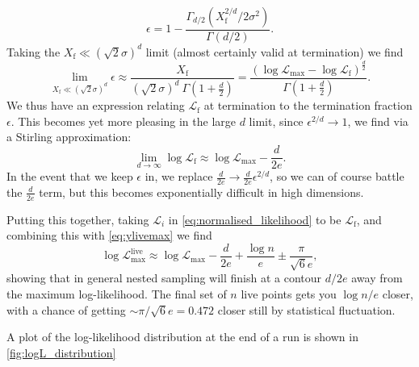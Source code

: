 \documentclass[usenatbib]{mnras}
\begin{document}
\begin{equation}
\epsilon = 1- \frac{\Gamma_{d/2}\left(X_\mathrm{f}^{2/d}/2\sigma^2\right)}{\Gamma(d/2)}.
\end{equation}
Taking the $X_\mathrm{f}\ll (\sqrt{2}\sigma)^d$ limit (almost certainly valid at termination) we find
\begin{equation}
    \lim_{X_\mathrm{f}\ll (\sqrt{2}\sigma)^d} \epsilon \approx \frac{X_\mathrm{f}}{(\sqrt{2}\sigma)^d \ \Gamma\left(1+\frac{d}{2}\right)} = \frac{(\log\mathcal{L}_\mathrm{max}-\log\mathcal{L}_\mathrm{f})^{\frac{d}{2}}}{\Gamma\left(1+\frac{d}{2}\right)}.
\end{equation}
We thus have an expression relating $\mathcal{L}_\mathrm{f}$ at termination to the termination fraction $\epsilon$. This becomes yet more pleasing in the large $d$ limit, since $\epsilon^{2/d}\to 1$, we find via a Stirling approximation:
\begin{equation}
    \lim_{d\to\infty} \log\mathcal{L}_\mathrm{f} \approx \log\mathcal{L}_\mathrm{max} - \frac{d}{2e}.
\end{equation}
In the event that we keep $\epsilon$ in, we replace $\frac{d}{2e}\to \frac{d}{2e}\epsilon^{2/d}$, so we can of course battle the $\frac{d}{2e}$ term, but this becomes exponentially difficult in high dimensions.
\par
Putting this together, taking $\mathcal{L}_i$ in \eqref{eq:normalised_likelihood} to be $\mathcal{L}_\mathrm{f}$, and combining this with \eqref{eq:ylivemax} we find
\begin{equation}
    \boxed{
        \log{\mathcal{L}}_\mathrm{max}^\mathrm{live} \approx \log\mathcal{L}_\mathrm{max} - \frac{d}{2e} + \frac{\log n}{e} \pm \frac{\pi}{\sqrt{6}e}
    },
\end{equation}
showing that in general nested sampling will finish at a contour $d/2e$ away from the maximum log-likelihood. The final set of $n$ live points gets you $\log n/e$ closer, with a chance of getting $\sim\pi/\sqrt{6}e=0.472$ closer still by statistical fluctuation. 
\par
A plot of the log-likelihood distribution at the end of a run is shown in \cref{fig:logL_distribution}
\end{document}
